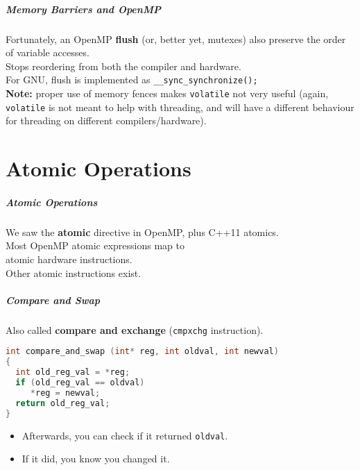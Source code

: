   
\begin{frame}
  \frametitle{Memory Barriers and OpenMP}

  
    Fortunately, an OpenMP {\bf flush} (or, better yet, mutexes) also preserve the order of variable accesses.\\[1em]
    Stops reordering from both the compiler and hardware.\\[1em]
    For GNU, flush is implemented as
      {\tt \_\_sync\_synchronize();}\\[1em]

  {\bf Note:} proper use of memory fences makes {\tt volatile} not very
  useful (again, {\tt volatile} is not meant to help with threading, and will
  have a different behaviour for threading on different compilers/hardware).
  
\end{frame}

\part{Atomic Operations}
\frame{\partpage}

\begin{frame}
  \frametitle{Atomic Operations}

  

 We saw the {\bf atomic} directive in OpenMP, plus C++11 atomics.\\[1em]

 Most OpenMP atomic expressions map to\\ atomic hardware instructions.\\[1em]

 Other atomic instructions exist.
  

\end{frame}

\begin{frame}[fragile]
  \frametitle{Compare and Swap}

  
  Also called {\bf compare and exchange} ({\tt cmpxchg} instruction).

  \begin{lstlisting}[language=C]
int compare_and_swap (int* reg, int oldval, int newval) 
{
  int old_reg_val = *reg;
  if (old_reg_val == oldval) 
     *reg = newval;
  return old_reg_val;
}
  \end{lstlisting}

  \begin{itemize}
    \item Afterwards, you can check if it returned {\tt oldval}.
    \item If it did, you know you changed it.
  \end{itemize}
  
\end{frame}

